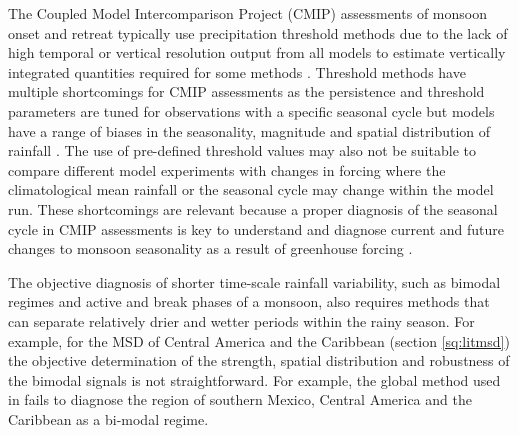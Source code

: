 The Coupled Model Intercomparison Project (CMIP) assessments of monsoon onset and retreat typically use precipitation threshold methods due to the lack of high temporal or vertical resolution output from all models to estimate vertically integrated quantities required for some methods \citep[e.g.][]{geil2013,zou2015,jamoon2020}. Threshold methods have multiple shortcomings for CMIP assessments as the persistence and threshold parameters are tuned for observations with a specific seasonal cycle but models have a range of biases in the seasonality, magnitude and spatial distribution of rainfall \citep{pascale2019,garciafranco2020}. 
The use of pre-defined threshold values may also not be suitable to compare different model experiments with changes in forcing where the climatological mean rainfall or the seasonal cycle may change within the model run.
These shortcomings are relevant because a proper diagnosis of the seasonal cycle in CMIP assessments is key to understand and diagnose current and future changes to monsoon seasonality as a result of greenhouse forcing \citep{zhou2016,wang2017}. 


The objective diagnosis of shorter time-scale rainfall variability, such as bimodal regimes and active and break phases of a monsoon, also requires methods that can separate relatively drier and wetter periods within the rainy season. For example, for the MSD of Central America and the Caribbean (section \ref{sq:litmsd}) the objective determination of the strength, spatial distribution and robustness of the bimodal signals is not straightforward. For example, the global method used in \cite{bombardi2019} fails to diagnose the region of southern Mexico, Central America and the Caribbean as a bi-modal regime. 

